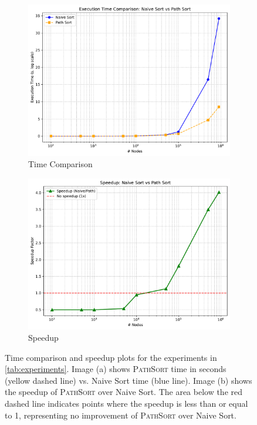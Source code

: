 \begin{figure}[H]
    \centering
    \begin{subfigure}[b]{0.48\textwidth}
        \centering
        \includegraphics[width=\textwidth]{"Immagini/execution_time_comparison.pdf"}
        \caption{Time Comparison}
        \label{fig:time_comparison}
    \end{subfigure}
    \hfill %
    \begin{subfigure}[b]{0.48\textwidth}
        \centering
        \includegraphics[width=\textwidth]{"Immagini/speedup_comparison.pdf"}
        \caption{Speedup}
        \label{fig:speedup}
    \end{subfigure}
    \caption{Time comparison and speedup plots for the experiments in \cref{tab:experiments}. Image (a) shows \textsc{PathSort} time in seconds (yellow dashed line) vs. Naive Sort time (blue line). Image (b) shows the speedup of \textsc{PathSort} over Naive Sort. The area below the red dashed line indicates points where the speedup is less than or equal to 1, representing no improvement of \textsc{PathSort} over Naive Sort.}
    \label{fig:xbwt_exp_plots}
\end{figure}

